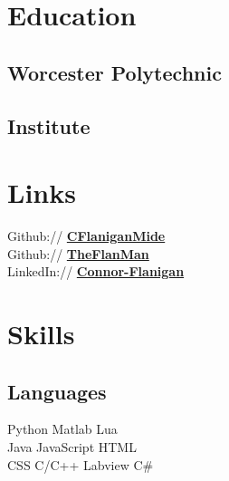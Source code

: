 \documentclass[letterpaper]{deedy-resume} %
\begin{document}
\begin{minipage}[t]{0.33\textwidth} %


\section{Education} 

\subsection{Worcester Polytechnic}
\subsection{Institute}


\sectionspace %


\section{Links} 

Github:// \href{https://github.com/CFlaniganMide}{\bf CFlaniganMide} \\
Github:// \href{https://github.com/theflanman}{\bf TheFlanMan} \\
LinkedIn:// \href{https://www.linkedin.com/in/connor-flanigan}{\bf Connor-Flanigan}

\sectionspace %


\section{Skills}

\subsection{Languages}

Python \textbullet{} Matlab \textbullet{} Lua \\ 
Java \textbullet{} JavaScript \textbullet{} HTML \\
CSS \textbullet{} C/C++ \textbullet{} Labview \textbullet{} C\# \\


\end{minipage}
\end{document}
